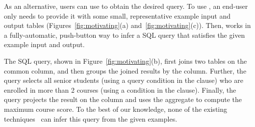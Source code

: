 As an alternative, users can use \ourtool to obtain
the desired query.
To use \ourtool, an end-user only needs to provide it with
some small, representative example input and output tables
(Figures~\ref{fig:motivating}(a) and~\ref{fig:motivating}(c)).
Then, \ourtool works in a fully-automatic, push-button
way to infer a SQL query that satisfies the given
example input and output.


The SQL query, shown in Figure~\ref{fig:motivating}(b),
first joins two tables on the common  column,
and then groups the joined results by the 
column. Further, the query selects all senior
students (using a query condition in the 
clause) who are enrolled in more than 2 courses
(using a condition in the  clause).
Finally, the query projects the result on the
 column and uses the  aggregate
to compute the maximum course score. To the best of
our knowledge, none of the existing techniques~\cite{Tran:2009, DasSarma:2010, Harris:2011,
 Kandel:2011}
can infer this query from the given examples.







